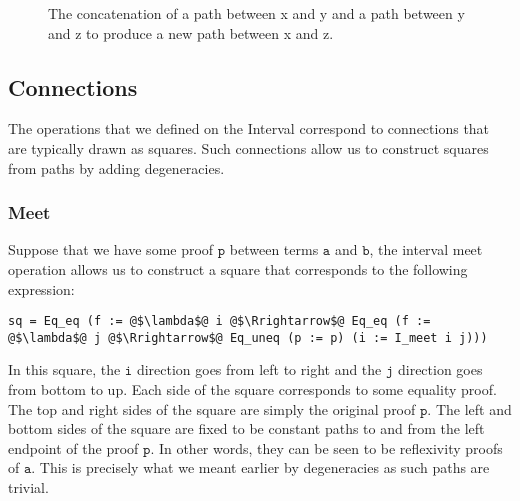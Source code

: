 \documentclass[12pt,twoside,maitrise]{dms}
\theoremstyle{definition}
\numberwithin{equation}{section}
\numberwithin{table}{chapter}
\numberwithin{figure}{chapter}
\newcommand\fn[1] {\texttt{#1}}
\begin{document}
\begin{figure}[H]

\caption{The concatenation of a path between x and y and a path between y and z to produce a new path between x and z.}
\end{figure}

\subsection*{Connections}\label{subsec:interval-connections}


The operations that we defined on the Interval correspond to
connections\cite{cohen2016cubical} that are typically drawn as squares. Such
connections allow us to construct squares from paths by adding degeneracies.

\subsubsection*{Meet}

Suppose that we have some proof $\fn{p}$ between terms $\fn{a}$ and $\fn{b}$,
the interval meet operation allows us to construct a square that corresponds to
the following expression:

\begin{verbatim}
sq = Eq_eq (f := @$\lambda$@ i @$\Rrightarrow$@ Eq_eq (f := @$\lambda$@ j @$\Rrightarrow$@ Eq_uneq (p := p) (i := I_meet i j)))
\end{verbatim}

In this square, the $\fn{i}$ direction goes from left to right and the
$\fn{j}$ direction goes from bottom to up. Each side of the square corresponds
to some equality proof. The top and right sides of the square are simply the
original proof $\fn{p}$. The left and bottom sides of the square are fixed to be
constant paths to and from the left endpoint of the proof $\fn{p}$. In other
words, they can be seen to be reflexivity proofs of $\fn{a}$. This is precisely
what we meant earlier by degeneracies as such paths are trivial.
\end{document}
